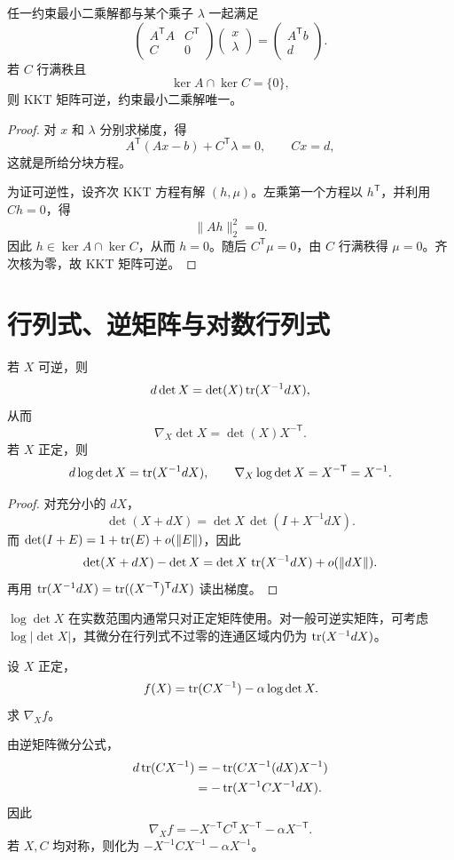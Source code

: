 \begin{theorem}
任一约束最小二乘解都与某个乘子 $\lambda$ 一起满足
\[
\begin{pmatrix}
A^{\mathsf T}A&C^{\mathsf T}\\
C&0
\end{pmatrix}
\begin{pmatrix}x\\\lambda\end{pmatrix}
=
\begin{pmatrix}A^{\mathsf T}b\\d\end{pmatrix}.
\]
若 $C$ 行满秩且
\[
\ker A\cap\ker C=\{0\},
\]
则 KKT 矩阵可逆，约束最小二乘解唯一。
\end{theorem}
\begin{proof}
对 $x$ 和 $\lambda$ 分别求梯度，得
\[
A^{\mathsf T}(Ax-b)+C^{\mathsf T}\lambda=0,
\qquad Cx=d,
\]
这就是所给分块方程。

为证可逆性，设齐次 KKT 方程有解 $(h,\mu)$。左乘第一个方程以 $h^{\mathsf T}$，并利用 $Ch=0$，得
\[
\lVert Ah\rVert_2^2=0.
\]
因此 $h\in\ker A\cap\ker C$，从而 $h=0$。随后 $C^{\mathsf T}\mu=0$，由 $C$ 行满秩得 $\mu=0$。齐次核为零，故 KKT 矩阵可逆。
\end{proof}

\section{行列式、逆矩阵与对数行列式}

\begin{theorem}
若 $X$ 可逆，则
\[
d\det X=\det(X)\operatorname{tr}(X^{-1}dX),
\]
从而
\[
\nabla_X\det X=\det(X)X^{-\mathsf T}.
\]
若 $X$ 正定，则
\[
d\log\det X=\operatorname{tr}(X^{-1}dX),
\qquad
\nabla_X\log\det X=X^{-\mathsf T}=X^{-1}.
\]
\end{theorem}
\begin{proof}
对充分小的 $dX$，
\[
\det(X+dX)=\det X\,\det(I+X^{-1}dX).
\]
而 $\det(I+E)=1+\operatorname{tr}(E)+o(\lVert E\rVert)$，因此
\[
\det(X+dX)-\det X
=\det X\,\operatorname{tr}(X^{-1}dX)+o(\lVert dX\rVert).
\]
再用
$\operatorname{tr}(X^{-1}dX)=\operatorname{tr}((X^{-\mathsf T})^{\mathsf T}dX)$
读出梯度。
\end{proof}

\begin{remark}
$\log\det X$ 在实数范围内通常只对正定矩阵使用。对一般可逆实矩阵，可考虑 $\log|\det X|$，其微分在行列式不过零的连通区域内仍为 $\operatorname{tr}(X^{-1}dX)$。
\end{remark}

\begin{example}[title={带对数行列式的梯度}]
设 $X$ 正定，
\[
f(X)=\operatorname{tr}(CX^{-1})-\alpha\log\det X.
\]
求 $\nabla_Xf$。
\begin{solution}
由逆矩阵微分公式，
\begin{align*}
d\operatorname{tr}(CX^{-1})
&=-\operatorname{tr}(CX^{-1}(dX)X^{-1})\\
&=-\operatorname{tr}(X^{-1}CX^{-1}dX).
\end{align*}
因此
\[
\nabla_Xf
=-X^{-\mathsf T}C^{\mathsf T}X^{-\mathsf T}
-\alpha X^{-\mathsf T}.
\]
若 $X,C$ 均对称，则化为
$-X^{-1}CX^{-1}-\alpha X^{-1}$。
\end{solution}
\end{example}

